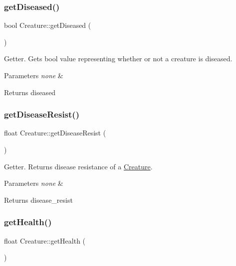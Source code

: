 \subsubsection{\texorpdfstring{get\+Diseased()}{getDiseased()}}
{\footnotesize\ttfamily bool Creature\+::get\+Diseased (\begin{DoxyParamCaption}{ }\end{DoxyParamCaption})}

Getter. Gets bool value representing whether or not a creature is diseased. 
\begin{DoxyParams}{Parameters}
{\em none} & \\
\hline
\end{DoxyParams}
\begin{DoxyReturn}{Returns}
diseased 
\end{DoxyReturn}
\mbox{\label{class_creature_a26cacf88614142bfab05c2602088f1ba}} 
\subsubsection{\texorpdfstring{get\+Disease\+Resist()}{getDiseaseResist()}}
{\footnotesize\ttfamily float Creature\+::get\+Disease\+Resist (\begin{DoxyParamCaption}{ }\end{DoxyParamCaption})}

Getter. Returns disease resistance of a \hyperlink{class_creature}{Creature}. 
\begin{DoxyParams}{Parameters}
{\em none} & \\
\hline
\end{DoxyParams}
\begin{DoxyReturn}{Returns}
disease\+\_\+resist 
\end{DoxyReturn}
\mbox{\label{class_creature_afbda0cd7841915f1fb1f0b00002e4d9a}} 
\subsubsection{\texorpdfstring{get\+Health()}{getHealth()}}
{\footnotesize\ttfamily float Creature\+::get\+Health (\begin{DoxyParamCaption}{ }\end{DoxyParamCaption})}

